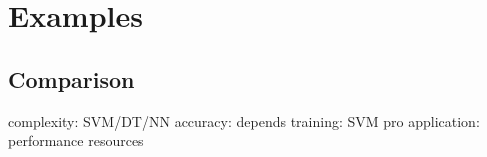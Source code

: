 \chapter{Examples}







\section{Comparison}
complexity: SVM/DT/NN
accuracy: depends
training: SVM pro
application: 
performance
resources